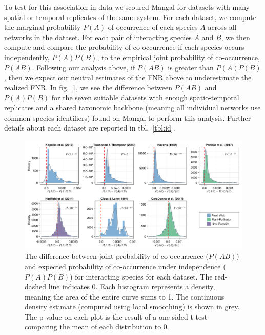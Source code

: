 \documentclass[11pt]{article}
\makeatletter
\def\maxwidth{\ifdim\Gin@nat@width>\linewidth\linewidth
\else\Gin@nat@width\fi}
\let\Oldincludegraphics\includegraphics
\renewcommand{\includegraphics}[1]{\Oldincludegraphics[width=\maxwidth]{#1}}
\makeatother
\begin{document}
To test for this association in data we scoured Mangal for datasets with
many spatial or temporal replicates of the same system. For each
dataset, we compute the marginal probability \(P(A)\) of occurrence of
each species \(A\) across all networks in the dataset. For each pair of
interacting species \(A\) and \(B\), we then compute and compare the
probability of co-occurrence if each species occurs independently,
\(P(A)P(B)\), to the empirical joint probability of co-occurrence,
\(P(AB)\). Following our analysis above, if \(P(AB)\) is greater than
\(P(A)P(B)\), then we expect our neutral estimates of the FNR above to
underestimate the realized FNR. In fig.~\ref{fig:mangal}, we see the
difference between \(P(AB)\) and \(P(A)P(B)\) for the seven suitable
datasets with enough spatio-temporal replicates and a shared taxonomic
backbone (meaning all individual networks use common species
identifiers) found on Mangal to perform this analysis. Further details
about each dataset are reported in tbl.~\ref{tbl:id}.

\begin{figure}
\hypertarget{fig:mangal}{%
\centering
\includegraphics{./figures/fig2.png}
\caption{The difference between joint-probability of co-occurrence
(\(P(AB)\)) and expected probability of co-occurrence under independence
(\(P(A)P(B)\)) for interacting species for each dataset. The red-dashed
line indicates 0. Each histogram represents a density, meaning the area
of the entire curve sums to 1. The continuous density estimate (computed
using local smoothing) is shown in grey. The p-value on each plot is the
result of a one-sided t-test comparing the mean of each distribution to
0.}\label{fig:mangal}
}
\end{figure}
\end{document}
